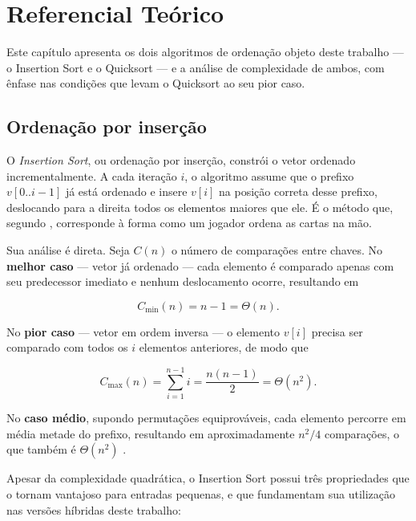 \chapter{Referencial Teórico}
\label{cap:referencial}

Este capítulo apresenta os dois algoritmos de ordenação objeto deste trabalho ---
o Insertion Sort e o Quicksort --- e a análise de complexidade de ambos, com ênfase
nas condições que levam o Quicksort ao seu pior caso.

\section{Ordenação por inserção}
\label{sec:insertion}

O \textit{Insertion Sort}, ou ordenação por inserção, constrói o vetor ordenado
incrementalmente. A cada iteração $i$, o algoritmo assume que o prefixo
$v[0..i-1]$ já está ordenado e insere $v[i]$ na posição correta desse prefixo,
deslocando para a direita todos os elementos maiores que ele. É o método que,
segundo , corresponde à forma como um jogador ordena as
cartas na mão.

Sua análise é direta. Seja $C(n)$ o número de comparações entre chaves. No
\textbf{melhor caso} --- vetor já ordenado --- cada elemento é comparado apenas com
seu predecessor imediato e nenhum deslocamento ocorre, resultando em

\begin{equation}
C_{\min}(n) = n - 1 = \Theta(n).
\end{equation}

No \textbf{pior caso} --- vetor em ordem inversa --- o elemento $v[i]$ precisa ser
comparado com todos os $i$ elementos anteriores, de modo que

\begin{equation}
C_{\max}(n) = \sum_{i=1}^{n-1} i = \frac{n(n-1)}{2} = \Theta(n^2).
\end{equation}

No \textbf{caso médio}, supondo permutações equiprováveis, cada elemento percorre
em média metade do prefixo, resultando em aproximadamente $n^2/4$ comparações, o
que também é $\Theta(n^2)$ \cite{cormen2022}.

Apesar da complexidade quadrática, o Insertion Sort possui três propriedades que o
tornam vantajoso para entradas pequenas, e que fundamentam sua utilização nas
versões híbridas deste trabalho:

